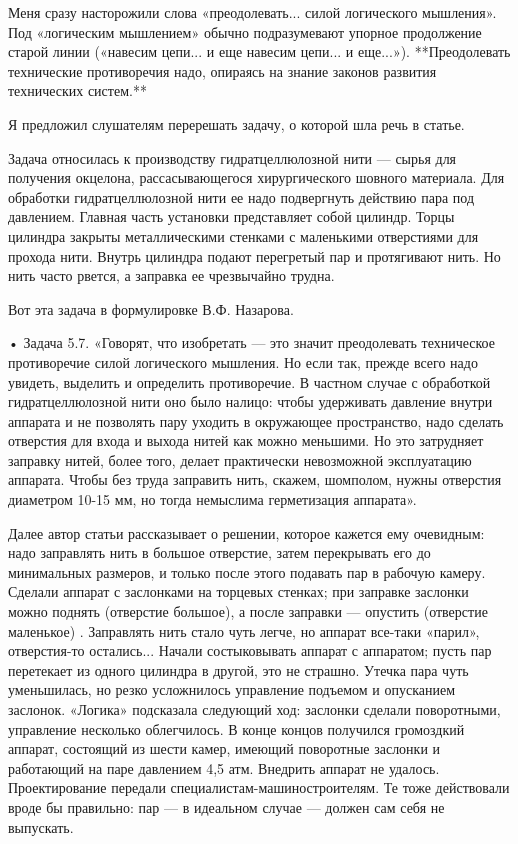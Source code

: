 Меня  сразу  насторожили   слова  «преодолевать...  силой  логического
мышления».  Под «логическим  мышлением»  обычно подразумевают  упорное
продолжение старой  линии («навесим  цепи... и  еще навесим  цепи... и
еще...»).  **Преодолевать технические  противоречия надо,  опираясь на
знание законов развития технических систем.**

Я предложил слушателям перерешать задачу, о которой шла речь в статье.

Задача относилась  к производству  гидратцеллюлозной нити —  сырья для
получения окцелона, рассасывающегося хирургического шовного материала.
Для  обработки гидратцеллюлозной  нити  ее  надо подвергнуть  действию
пара  под  давлением.  Главная   часть  установки  представляет  собой
цилиндр. Торцы  цилиндра закрыты металлическими стенками  с маленькими
отверстиями для прохода нити. Внутрь  цилиндра подают перегретый пар и
протягивают  нить. Но  нить часто  рвется, а  заправка ее  чрезвычайно
трудна.

Вот эта задача в формулировке В.Ф. Назарова.

•  Задача 5.7.  «Говорят,  что изобретать  —  это значит  преодолевать
техническое  противоречие силой  логического  мышления.  Но если  так,
прежде  всего  надо увидеть,  выделить  и  определить противоречие.  В
частном случае  с обработкой  гидратцеллюлозной нити оно  было налицо:
чтобы удерживать давление внутри аппарата  и не позволять пару уходить
в окружающее пространство,  надо сделать отверстия для  входа и выхода
нитей  как можно  меньшими. Но  это затрудняет  заправку нитей,  более
того, делает практически невозможной  эксплуатацию аппарата. Чтобы без
труда  заправить нить,  скажем,  шомполом,  нужны отверстия  диаметром
10-15 мм, но тогда немыслима герметизация аппарата».

Далее  автор  статьи  рассказывает  о  решении,  которое  кажется  ему
очевидным: надо заправлять нить в большое отверстие, затем перекрывать
его  до минимальных  размеров, и  только  после этого  подавать пар  в
рабочую  камеру. Сделали  аппарат  с заслонками  на торцевых  стенках;
при  заправке  заслонки можно  поднять  (отверстие  большое), а  после
заправки — опустить (отверстие маленькое) . Заправлять нить стало чуть
легче, но  аппарат все-таки  «парил», отверстия-то  остались... Начали
состыковывать  аппарат с  аппаратом;  пусть пар  перетекает из  одного
цилиндра в  другой, это не  страшно. Утечка пара чуть  уменьшилась, но
резко усложнилось управление подъемом  и опусканием заслонок. «Логика»
подсказала  следующий ход:  заслонки  сделали поворотными,  управление
несколько облегчилось.  В конце  концов получился  громоздкий аппарат,
состоящий из шести камер, имеющий  поворотные заслонки и работающий на
паре давлением  4,5 атм.  Внедрить аппарат не  удалось. Проектирование
передали специалистам-машиностроителям.  Те тоже действовали  вроде бы
правильно: пар — в идеальном случае — должен сам себя не выпускать.

